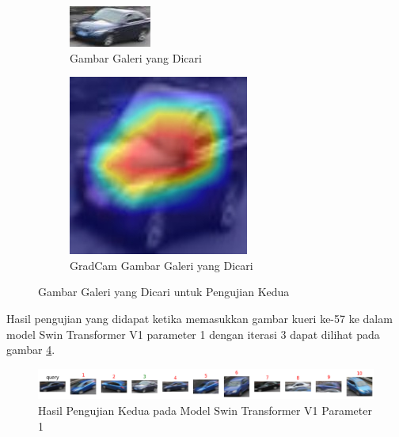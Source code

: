 \begin{figure}[h!]
  \centering
  \begin{subfigure}{.5\textwidth}
    \centering
    \includegraphics[width=.4\linewidth]{gambar/Gal57_1112.jpg}
    \caption{Gambar Galeri yang Dicari}
    \label{gambargalerinomorlimatujuh}
  \end{subfigure}%
  \begin{subfigure}{.5\textwidth}
    \centering
    \includegraphics[width=.4\linewidth]{gambar/GradCamGal57_1112.jpg}
    \caption{GradCam Gambar Galeri yang Dicari}
    \label{gradcamgambargalerinomorlimatujuh}
  \end{subfigure}
  \caption{Gambar Galeri yang Dicari untuk Pengujian Kedua}
  \label{fig:gambargaleriuntukpengujiankedua}
\end{figure}

Hasil pengujian yang didapat ketika memasukkan gambar kueri ke-57 ke dalam model Swin Transformer V1 parameter 1 dengan 
iterasi 3 dapat dilihat pada gambar \ref{fig:hasilpengujiankeduapadamodelswintransformerv1param1}.\\

\begin{figure}[h!]
  \centering
  \includegraphics[scale=0.6]{gambar/qUE57v1P1IT3.png}
  \caption{Hasil Pengujian Kedua pada Model Swin Transformer V1 Parameter 1}
  \label{fig:hasilpengujiankeduapadamodelswintransformerv1param1}
\end{figure}

